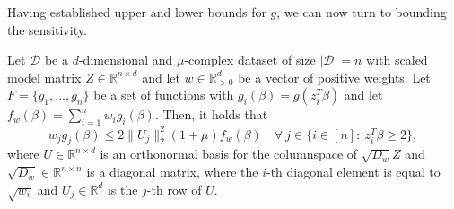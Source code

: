 Having established upper and lower bounds for $g$, we can now turn
to bounding the sensitivity.

\begin{lemma}
    \label{lemma:g-bounds-1}
    Let $\mathcal{D}$ be a $d$-dimensional and $\mu$-complex dataset of size
    $|\mathcal{D}|=n$ with scaled model matrix
    $Z \in \mathbb{R}^{n \times d}$ and let $w \in \mathbb{R}^d_{>0}$
    be a vector of positive weights.
    Let $F = \{g_1, ..., g_n\}$ be a set of functions with
    $g_i(\beta) = g(z_i^T \beta)$ and let
    $f_w(\beta) = \sum_{i=1}^n w_ig_i(\beta)$.
    Then, it holds that
    \begin{equation*}
        w_jg_j(\beta) \leq 2 \lVert U_j \rVert_2^2(1 + \mu)f_w(\beta) \quad
        \forall\ j \in \{i \in [n]:\ z_i^T \beta \geq 2 \},
    \end{equation*}
    where $U \in \mathbb{R}^{n \times d}$ is an orthonormal basis for
    the columnspace of $\sqrt{D_w}Z$ and $\sqrt{D_w} \in \mathbb{R}^{n \times n}$
    is a diagonal matrix, where the $i$-th diagonal element is equal to
    $\sqrt{w_i}$ and $U_j \in \mathbb{R}^d$ is the $j$-th row of $U$.
\end{lemma}
